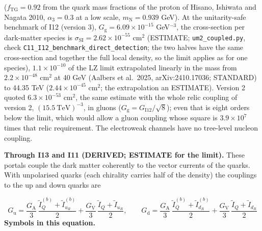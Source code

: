 \documentclass[
  10pt,
]{article}
\begin{document}
(\(f_{\mathrm{TG}} = 0.92\) from the quark mass fractions of the proton
of Hisano, Ishiwata and Nagata 2010, \(\alpha_3 = 0.3\) at a low scale,
\(m_{\mathrm{N}} = 0.939\) GeV). At the unitarity-safe benchmark of I12
(version 3), \(G_{\mathrm{g}} = 6.09\times10^{-15}\) GeV\(^{-3}\), the
cross-section per dark-matter species is
\(\sigma_{\mathrm{SI}} = 2.62\times10^{-55}\) cm\(^2\) (ESTIMATE;
\texttt{um2\_coupled.py}, check
\texttt{C11\_I12\_benchmark\_direct\_detection}; the two halves have the
same cross-section and together the full local density, so the limit
applies as for one species), \(1.1\times10^{-10}\) of the LZ limit
extrapolated linearly in the mass from \(2.2\times10^{-48}\) cm\(^2\) at
40 GeV (Aalbers et al.~2025, arXiv:2410.17036; STANDARD) to 44.35 TeV
(\(2.44\times10^{-45}\) cm\(^2\); the extrapolation an ESTIMATE).
Version 2 quoted \(6.3\times10^{-53}\) cm\(^2\), the same estimate with
the whole relic coupling of version 2, \((15.5\ \text{TeV})^{-3}\), in
gluons (\(G_{\mathrm{g}} = G_{\mathrm{I12}}/\sqrt8\)); even that is
eight orders below the limit, which would allow a gluon coupling whose
square is \(3.9\times10^7\) times that relic requirement. The
electroweak channels have no tree-level nucleon coupling.

\textbf{Through I13 and I11 (DERIVED; ESTIMATE for the limit).} These
portals couple the dark matter coherently to the vector currents of the
quarks. With unpolarised quarks (each chirality carries half of the
density) the couplings to the up and down quarks are

\[ G_{\mathrm{u}} = \frac{G_{\mathrm{A}}}{3}\,\frac{\tilde I^{(b)}_Q + \tilde I^{(b)}_{u_R}}{2} + \frac{G_{\mathrm{V}}}{3}\,\frac{\tilde I_Q + \tilde I_{u_R}}{2},\qquad G_{\mathrm{d}} = \frac{G_{\mathrm{A}}}{3}\,\frac{\tilde I^{(b)}_Q + \tilde I^{(b)}_{d_R}}{2} + \frac{G_{\mathrm{V}}}{3}\,\frac{\tilde I_Q + \tilde I_{d_R}}{2} \]
\textbf{Symbols in this equation.}
\end{document}
